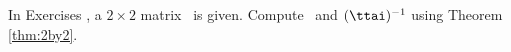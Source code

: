 {\noin In Exercises }
{, a $2\times 2$ matrix \tta\ is given. Compute \ttai\ and $(\ttai)^{-1}$ using Theorem \ref{thm:2by2}.}
